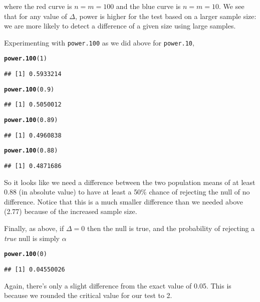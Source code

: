 \documentclass[addpoints,12pt]{exam}\usepackage[]{graphicx}\usepackage[]{color}
\makeatletter
\newcommand{\hlnum}[1]{\textcolor[rgb]{0.686,0.059,0.569}{#1}}%
\newcommand{\hlstd}[1]{\textcolor[rgb]{0.345,0.345,0.345}{#1}}%
\newcommand{\hlkwd}[1]{\textcolor[rgb]{0.737,0.353,0.396}{\textbf{#1}}}%
\newenvironment{kframe}{%
 \def\at@end@of@kframe{}%
 \ifinner\ifhmode%
  \def\at@end@of@kframe{\end{minipage}}%
  \begin{minipage}{\columnwidth}%
 \fi\fi%
 \def\FrameCommand##1{\hskip\@totalleftmargin \hskip-\fboxsep
 \colorbox{shadecolor}{##1}\hskip-\fboxsep
     \hskip-\linewidth \hskip-\@totalleftmargin \hskip\columnwidth}%
 \MakeFramed {\advance\hsize-\width
   \@totalleftmargin\z@ \linewidth\hsize
   \@setminipage}}%
 {\par\unskip\endMakeFramed%
 \at@end@of@kframe}
\newenvironment{knitrout}{}{} %
\makeatother
\begin{document}
\begin{questions}
\begin{parts}
\begin{solution}
\begin{knitrout}
{}



\end{knitrout}
where the red curve is $n = m = 100$ and the blue curve is $n=m=10$. We see that for any value of $\Delta$, power is higher for the test based on a larger sample size: we are more likely to detect a difference of a given size using large samples. 

Experimenting with \texttt{power.100} as we did above for \texttt{power.10}, 
\begin{knitrout}
\color{fgcolor}\begin{kframe}
\begin{alltt}
\hlkwd{power.100}\hlstd{(}\hlnum{1}\hlstd{)}
\end{alltt}
\begin{verbatim}
## [1] 0.5933214
\end{verbatim}
\begin{alltt}
\hlkwd{power.100}\hlstd{(}\hlnum{0.9}\hlstd{)}
\end{alltt}
\begin{verbatim}
## [1] 0.5050012
\end{verbatim}
\begin{alltt}
\hlkwd{power.100}\hlstd{(}\hlnum{0.89}\hlstd{)}
\end{alltt}
\begin{verbatim}
## [1] 0.4960838
\end{verbatim}
\begin{alltt}
\hlkwd{power.100}\hlstd{(}\hlnum{0.88}\hlstd{)}
\end{alltt}
\begin{verbatim}
## [1] 0.4871686
\end{verbatim}
\end{kframe}
\end{knitrout}
So it looks like we need a difference between the two population means of at least 0.88 (in absolute value) to have at least a 50\% chance of rejecting the null of no difference. Notice that this is a much smaller difference than we needed above (2.77) because of the increased sample size. 

Finally, as above, if $\Delta = 0$ then the null is true, and the probability of rejecting a \emph{true} null is simply $\alpha$
\begin{knitrout}
\color{fgcolor}\begin{kframe}
\begin{alltt}
\hlkwd{power.100}\hlstd{(}\hlnum{0}\hlstd{)}
\end{alltt}
\begin{verbatim}
## [1] 0.04550026
\end{verbatim}
\end{kframe}
\end{knitrout}
Again, there's only a slight difference from the exact value of 0.05. This is because we rounded the critical value for our test to 2. 
        \end{solution}
	\end{parts}



\end{questions}
\end{document}
